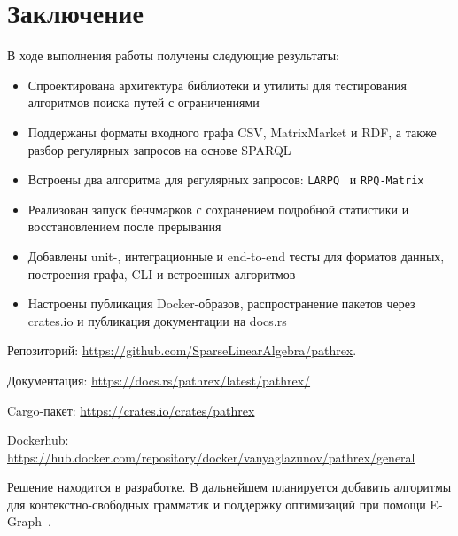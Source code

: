 \documentclass[a4paper]{article}
\begin{document}
\section{Заключение}

В ходе выполнения работы получены следующие результаты:


\begin{itemize}
    \item Спроектирована архитектура библиотеки и утилиты для тестирования алгоритмов поиска путей с ограничениями
    \item Поддержаны форматы входного графа CSV, MatrixMarket и RDF, а также разбор регулярных запросов на основе SPARQL
    \item Встроены два алгоритма для регулярных запросов: \texttt{LARPQ}~\cite{single-source-rpq} и \texttt{RPQ-Matrix}~\cite{arroyuelo2023rpqmatrix}
    \item Реализован запуск бенчмарков с сохранением подробной статистики и восстановлением после прерывания
    \item Добавлены unit-, интеграционные и end-to-end тесты для форматов данных, построения графа, CLI и встроенных алгоритмов
    \item Настроены публикация Docker-образов, распространение пакетов через crates.io и публикация документации на docs.rs
\end{itemize}


Репозиторий: \url{https://github.com/SparseLinearAlgebra/pathrex}.

Документация: \url{https://docs.rs/pathrex/latest/pathrex/}

Cargo-пакет: \url{https://crates.io/crates/pathrex}

Dockerhub: \url{https://hub.docker.com/repository/docker/vanyaglazunov/pathrex/general}

Решение находится в разработке.
В дальнейшем планируется добавить алгоритмы для контекстно-свободных грамматик и поддержку оптимизаций при помощи E-Graph~\cite{egg}.



\end{document}
